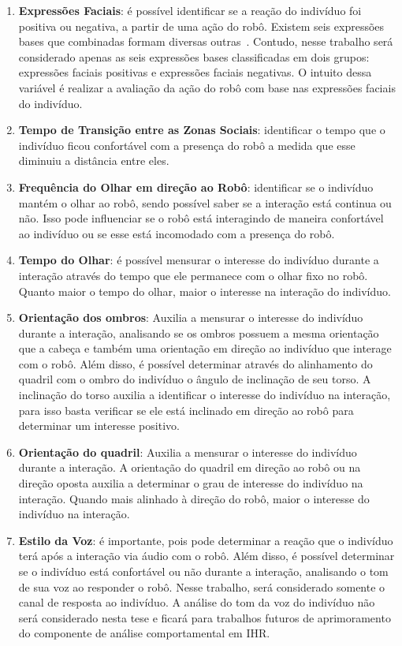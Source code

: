 \begin{enumerate}
	\item \textbf{Expressões Faciais}: é possível identificar se a reação do indivíduo foi positiva ou negativa, a partir de uma ação do robô. Existem seis expressões bases que combinadas formam diversas outras~\cite{Bihan:2014}. Contudo, nesse trabalho será considerado apenas as seis expressões bases classificadas em dois grupos: expressões faciais positivas e expressões faciais negativas. O intuito dessa variável é realizar a avaliação da ação do robô com base nas expressões faciais do indivíduo.
	\item \textbf{Tempo de Transição entre as Zonas Sociais}: identificar o tempo que o indivíduo ficou confortável com a presença do robô a medida que esse diminuiu a distância entre eles.
	\item \textbf{Frequência do Olhar em direção ao Robô}: identificar se o indivíduo mantém o olhar ao robô, sendo possível saber se a interação está continua ou não. Isso pode influenciar se o robô está interagindo de maneira confortável ao indivíduo ou se esse está incomodado com a presença do robô.
	\item \textbf{Tempo do Olhar}: é possível mensurar o interesse do indivíduo durante a interação através do tempo que ele permanece com o olhar fixo no robô. Quanto maior o tempo do olhar, maior o interesse na interação do indivíduo.
	\item \textbf{Orientação dos ombros}: Auxilia a mensurar o interesse do indivíduo durante a interação, analisando se os ombros possuem a mesma orientação que a cabeça e também uma orientação em direção ao indivíduo que interage com o robô. Além disso, é possível determinar através do alinhamento do quadril com o ombro do indivíduo o ângulo de inclinação de seu torso. A inclinação do torso auxilia a identificar o interesse do indivíduo na interação, para isso basta verificar se ele está inclinado em direção ao robô para determinar um interesse positivo.
	\item \textbf{Orientação do quadril}: Auxilia a mensurar o interesse do indivíduo durante a interação. A orientação do quadril em direção ao robô ou na direção oposta auxilia a determinar o grau de interesse do indivíduo na interação. Quando mais alinhado à direção do robô, maior o interesse do indivíduo na interação.
	\item \textbf{Estilo da Voz}: é importante, pois pode determinar a reação que o indivíduo terá após a interação via áudio com o robô. Além disso, é possível determinar se o indivíduo está confortável ou não durante a interação, analisando o tom de sua voz ao responder o robô. Nesse trabalho, será considerado somente o canal de resposta ao indivíduo. A análise do tom da voz do indivíduo não será considerado nesta tese e ficará para trabalhos futuros de aprimoramento do componente de análise comportamental em IHR.
\end{enumerate}

